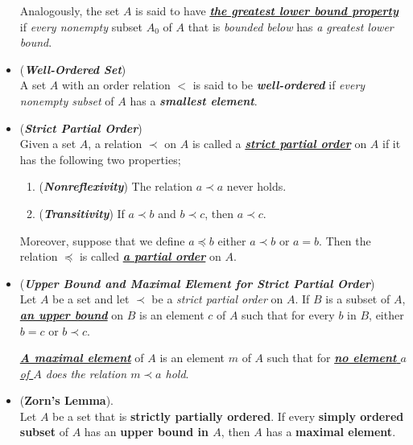 \documentclass[11pt]{article}
\begin{document}
\begin{itemize}
\begin{definition}
Analogously, the set $A$ is said to have \underline{\emph{\textbf{the greatest lower bound property}}} if \emph{every nonempty} subset $A_0$ of $A$ that is \emph{bounded below} has \emph{a greatest lower bound}.
\end{definition}

\item \begin{definition} (\emph{\textbf{Well-Ordered Set}}) \\
A set $A$ with an order relation $<$ is said to be \emph{\textbf{well-ordered}} if \emph{every nonempty subset} of $A$ has a \emph{\textbf{smallest element}}.
\end{definition}

\item \begin{definition} (\emph{\textbf{Strict Partial Order}})\\
Given a set $A$, a relation $\prec$ on $A$ is called a \underline{\emph{\textbf{strict partial order}}} on $A$ if it has the following two properties;
\begin{enumerate}
\item (\emph{\textbf{Nonreflexivity}}) The relation $a \prec a$ never holds.
\item (\emph{\textbf{Transitivity}}) If $a \prec b$ and $b \prec c$, then $a \prec c$.
\end{enumerate}
Moreover, suppose that we define $a \preceq b$ either $a \prec b$ or $a = b$. Then the relation $\preceq$ is called \underline{\emph{\textbf{a partial order}}} on $A$.
\end{definition}

\item \begin{definition} (\emph{\textbf{Upper Bound and Maximal Element for Strict Partial Order}})\\
Let $A$ be a set and let $\prec$ be a \emph{strict partial order} on $A$. If $B$ is a subset of $A$, \underline{\emph{\textbf{an upper bound}}} on $B$ is an element $c$ of $A$ such that for every $b$ in $B$, either $b = c$ or $b \prec c$. 

\underline{\emph{\textbf{A maximal element}}} of $A$ is an element $m$ of $A$ such that for \emph{\underline{\textbf{no element} $a$ of $A$} does the relation $m \prec a$ hold}.
\end{definition}

\item \begin{theorem} (\textbf{Zorn's Lemma}). \citep{munkres2000topology} \\
Let $A$ be a set that is \textbf{strictly partially ordered}. If every \textbf{simply ordered subset} of $A$ has an \textbf{upper bound in $A$}, then $A$ has a \textbf{maximal element}.
\end{theorem}


\end{itemize}
\end{document}
